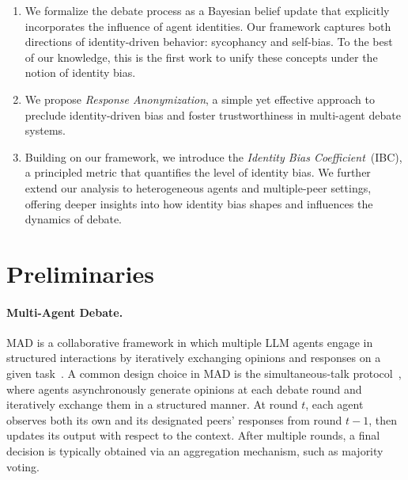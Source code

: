 \documentclass{article}
\begin{document}
\begin{enumerate}[leftmargin=*]
    \item We formalize the debate process as a Bayesian belief update that explicitly incorporates the influence of agent identities. Our framework captures both directions of identity-driven behavior: sycophancy and self-bias. To the best of our knowledge, this is the first work to unify these concepts under the notion of identity bias.
    \item We propose \textit{Response Anonymization}, a simple yet effective approach to preclude identity-driven bias and foster trustworthiness in multi-agent debate systems.
    \item Building on our framework, we introduce the \textit{Identity Bias Coefficient}~(IBC), a principled metric that quantifies the level of identity bias. We further extend our analysis to heterogeneous agents and multiple-peer settings, offering deeper insights into how identity bias shapes and influences the dynamics of debate.
\end{enumerate}


\section{Preliminaries}

\paragraph{Multi-Agent Debate.}
MAD is a collaborative framework in which multiple LLM agents engage in structured interactions by iteratively exchanging opinions and responses on a given task~\citep{bo2024reflective, du2024improving, chanchateval, tang2024medagents, wuautogen, chenagentverse}.
A common design choice in MAD is the simultaneous-talk protocol~\citep{chanchateval}, where agents asynchronously generate opinions at each debate round and iteratively exchange them in a structured manner.
At round $t$, each agent observes both its own and its designated peers’ responses from round $t-1$, then updates its output with respect to the context.
After multiple rounds, a final decision is typically obtained via an aggregation mechanism, such as majority voting.



\end{document}
